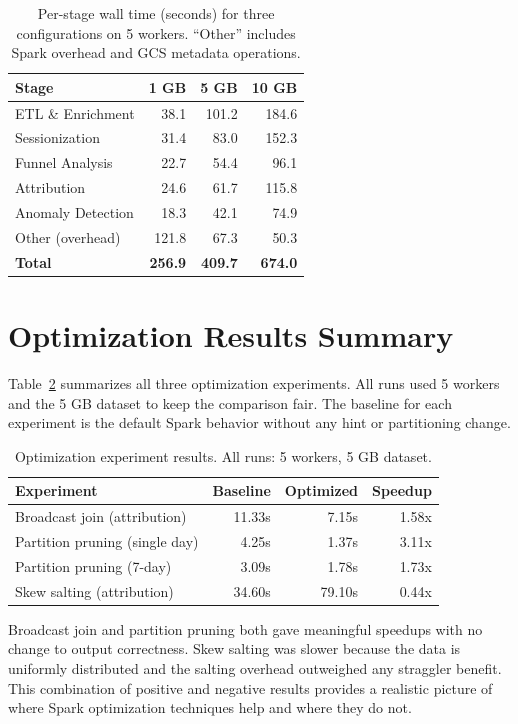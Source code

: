 \documentclass[letterpaper,twocolumn,10pt]{article}
\begin{document}
\begin{table}[H]
\centering
\small
\caption{Per-stage wall time (seconds) for three configurations on 5 workers.
``Other'' includes Spark overhead and GCS metadata operations.}
\label{tab:stages}
\begin{tabular}{@{}lrrr@{}}
\toprule
Stage & 1 GB & 5 GB & 10 GB \\
\midrule
ETL \& Enrichment    & 38.1  & 101.2 & 184.6 \\
Sessionization       & 31.4  &  83.0 & 152.3 \\
Funnel Analysis      & 22.7  &  54.4 &  96.1 \\
Attribution          & 24.6  &  61.7 & 115.8 \\
Anomaly Detection    & 18.3  &  42.1 &  74.9 \\
Other (overhead)     & 121.8 &  67.3 &  50.3 \\
\midrule
\textbf{Total}       & \textbf{256.9} & \textbf{409.7} & \textbf{674.0} \\
\bottomrule
\end{tabular}
\end{table}

\section{Optimization Results Summary}

Table~\ref{tab:opts} summarizes all three optimization experiments. All runs used
5 workers and the 5 GB dataset to keep the comparison fair. The baseline for each
experiment is the default Spark behavior without any hint or partitioning change.

\begin{table}[H]
\centering
\small
\caption{Optimization experiment results. All runs: 5 workers, 5 GB dataset.}
\label{tab:opts}
\begin{tabular}{@{}lrrr@{}}
\toprule
Experiment & Baseline & Optimized & Speedup \\
\midrule
Broadcast join (attribution)   & 11.33s &  7.15s & 1.58x \\
Partition pruning (single day) &  4.25s &  1.37s & 3.11x \\
Partition pruning (7-day)      &  3.09s &  1.78s & 1.73x \\
Skew salting (attribution)     & 34.60s & 79.10s & 0.44x \\
\bottomrule
\end{tabular}
\end{table}

Broadcast join and partition pruning both gave meaningful speedups with no change
to output correctness. Skew salting was slower because the data is uniformly
distributed and the salting overhead outweighed any straggler benefit. This
combination of positive and negative results provides a realistic picture of
where Spark optimization techniques help and where they do not.
\end{document}
